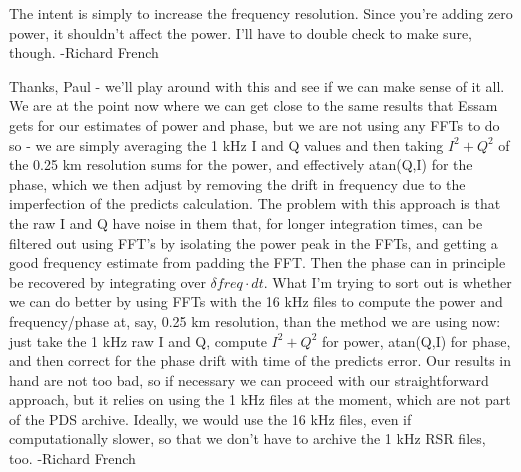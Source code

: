 \documentclass[crop=false,class=article,oneside]{standalone}
\begin{document}
The intent is simply to increase the frequency resolution.  Since you’re adding zero power, it shouldn’t affect the power.  I’ll have to double check to make sure, though. -Richard French\par
Thanks, Paul - we'll play around with this and see if we can make sense of it all. We are at the point now where we can get close to the same results that Essam gets for our estimates of power and phase, but we are not using any FFTs to do so - we are simply averaging the 1 kHz I and Q values and then taking $I^{2} + Q^{2}$ of the 0.25 km resolution sums for the power, and effectively atan(Q,I) for the phase, which we then adjust by removing the drift in frequency due to the imperfection of the predicts calculation. The problem with this approach is that the raw I and Q have noise in them that, for longer integration times, can be filtered out using FFT's by isolating the power peak in the FFTs, and getting a good frequency estimate from padding the FFT. Then the phase can in principle be recovered by integrating over $\delta freq\cdot dt$. What I'm trying to sort out is whether we can do better by using FFTs with the 16 kHz files to compute the power and frequency/phase at, say, 0.25 km resolution, than the method we are using now: just take the 1 kHz raw I and Q, compute $I^{2} + Q^{2}$ for power, atan(Q,I) for phase, and then correct for the phase drift with time of the predicts error. Our results in hand are not too bad, so if necessary we can proceed with our straightforward approach, but it relies on using the 1 kHz files at the moment, which are not part of the PDS archive. Ideally, we would use the 16 kHz files, even if computationally slower, so that we don't have to archive the 1 kHz RSR files, too. -Richard French
\end{document}
